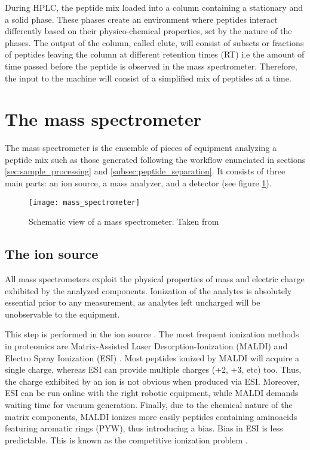 \documentclass[thesis]{subfiles}
\begin{document}
During \ac{HPLC}, the peptide mix loaded into a column containing a stationary and a solid phase. These phases create an environment where peptides interact differently based on their physico-chemical properties, set by the nature of the phases. The output of the column, called elute, will consist of subsets or fractions of peptides leaving the column at different retention times (\ac{RT}) i.e the amount of time passed before the peptide is observed in the mass spectrometer. Therefore, the input to the machine will consist of a simplified mix of peptides at a time.

\section{The mass spectrometer}
\label{sec:the_mass_spectrometer}

The mass spectrometer is the ensemble of pieces of equipment analyzing a peptide mix such as those generated following the workflow enunciated in sections \ref{sec:sample_processing} and \ref{subsec:peptide_separation}. It consists of three main parts: an ion source, a mass analyzer, and a detector (see figure \ref{fig:mass_spectrometer}).

\begin{figure}[!h]
\texttt{[image: mass\_spectrometer]}
\caption[]{Schematic view of a mass spectrometer. Taken from \footnotemark{}}
\label{fig:mass_spectrometer}
\end{figure}


\subsection{The ion source}
\label{subsec:the_ion_source}

All mass spectrometers exploit the physical properties of mass and electric charge exhibited by the analyzed components. Ionization of the analytes is absolutely essential prior to any measurement, as analytes left uncharged will be unobservable to the equipment.


This step is performed in the ion source \cite{Barsnes2008}. The most frequent ionization methods in proteomics are Matrix-Assisted Laser Desorption-Ionization (\ac{MALDI}) and Electro Spray Ionization (\ac{ESI}) \cite{Mirzaei2016}. Most peptides ionized by MALDI will acquire a single charge, whereas ESI can provide multiple charges (+2, +3, etc) too. Thus, the charge exhibited by an ion is not obvious when produced via ESI. Moreover, ESI can be run online with the right robotic equipment, while MALDI demands waiting time for vacuum generation. Finally, due to the chemical nature of the matrix components, MALDI ionizes more easily peptides containing aminoacids featuring aromatic rings (PYW), thus introducing a bias. Bias in ESI is less predictable. This is known as the competitive ionization problem \cite{Tang2004}.
\end{document}
